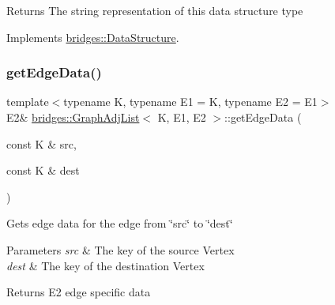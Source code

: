 \begin{DoxyReturn}{Returns}
The string representation of this data structure type 
\end{DoxyReturn}


Implements \mbox{\hyperlink{classbridges_1_1_data_structure_a957a63b106e340bc753620c650632bdc}{bridges\+::\+Data\+Structure}}.

\mbox{\label{classbridges_1_1_graph_adj_list_a3e4b21d0ff4b277502b2bb10e57df3c7}} 
\subsubsection{\texorpdfstring{get\+Edge\+Data()}{getEdgeData()}}
{\footnotesize\ttfamily template$<$typename K, typename E1 = K, typename E2 = E1$>$ \\
E2\& \mbox{\hyperlink{classbridges_1_1_graph_adj_list}{bridges\+::\+Graph\+Adj\+List}}$<$ K, E1, E2 $>$\+::get\+Edge\+Data (\begin{DoxyParamCaption}\item[{const K \&}]{src,  }\item[{const K \&}]{dest }\end{DoxyParamCaption})\hspace{0.3cm}{\ttfamily [inline]}}

Gets edge data for the edge from \char`\"{}src\char`\"{} to \char`\"{}dest\char`\"{}


\begin{DoxyParams}{Parameters}
{\em src} & The key of the source Vertex \\
\hline
{\em dest} & The key of the destination Vertex\\
\hline
\end{DoxyParams}
\begin{DoxyReturn}{Returns}
E2 edge specific data 
\end{DoxyReturn}
\mbox{\label{classbridges_1_1_graph_adj_list_a6e065b1411388387ff1e4df9227ce480}} 
